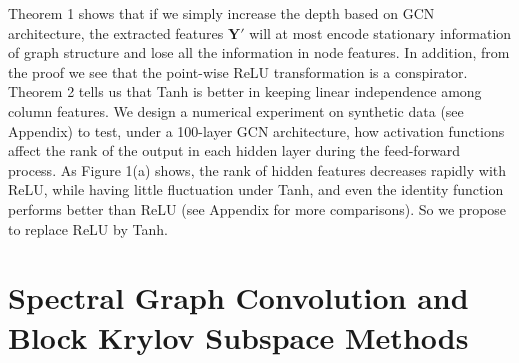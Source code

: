 \documentclass{article}
\begin{document}
Theorem 1 shows that if we simply increase the depth based on GCN architecture, the extracted features $\bm{Y'}$ will at most encode stationary information of graph structure and lose all the information in node features. In addition, from the proof we see that the point-wise ReLU transformation is a conspirator. Theorem 2 tells us that Tanh is better in keeping linear independence among column features. We design a numerical experiment on synthetic data (see Appendix) to test, under a 100-layer GCN architecture, how activation functions affect the rank of the output in each hidden layer during the feed-forward process. As Figure 1(a) shows, the rank of hidden features decreases rapidly with ReLU, while having little fluctuation under Tanh, and even the identity function performs better than ReLU (see Appendix for more comparisons). So we propose to replace ReLU by Tanh.%
\begin{figure*}[htbp]
\centering
{}}
\hfill
\subfloat[Snowball]{
\captionsetup{justification = centering}
\texttt{[image: \{fig\_snowball\_compare]}.pdf}}
\hfill
\subfloat[Truncated Block Krylov]{
\captionsetup{justification = centering}
\texttt{[image: \{fig\_truncated\_krylov\_compare]}.pdf}}
\caption{Number of independent column features }
\label{activation_functions}
\end{figure*}
\section{Spectral Graph Convolution and Block Krylov Subspace Methods}
\end{document}
